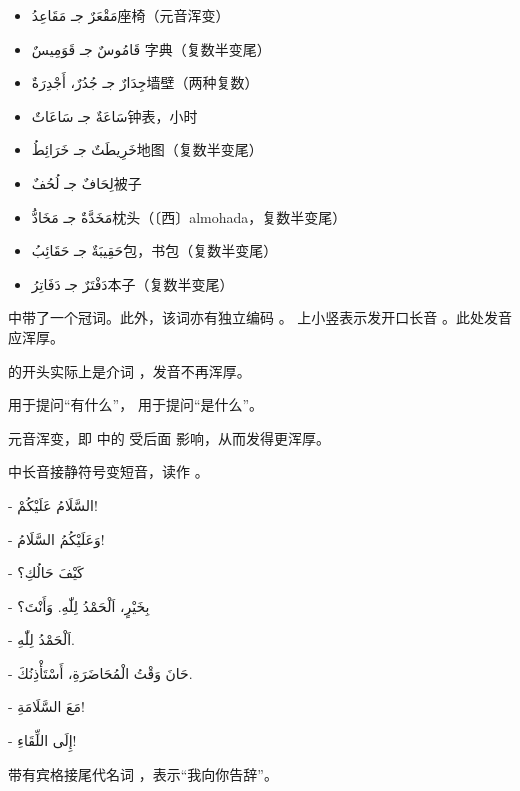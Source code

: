\begin{itemize}
    \item \ac{مَقْعَرٌ جـ مَقَاعِدُ}{座椅（元音浑变）}
    \item \ac{قَامُوسٌ جـ قَوَمِيسٌ }{字典（复数半变尾）}
    \item \ac{جِدَارٌ جـ جُدُرٌ، أَجْدِرَةٌ}{墙壁（两种复数）}
    \item \ac{سَاعَةٌ جـ سَاعَاتٌ}{钟表，小时}
    \item \ac{خَرِيطَتٌ جـ خَرَائِطُ}{地图（复数半变尾）}
    \item \ac{لِحَافٌ جـ لُحُفٌ}{被子}
    \item \ac{مَخَدَّةٌ جـ مَخَادُّ}{枕头（〔西〕almohada，复数半变尾）}
    \item \ac{حَقِيبَةٌ جـ حَقَائِبُ}{包，书包（复数半变尾）}
    \item \ac{دَفْتَرٌ جـ دَفَاتِرُ}{本子（复数半变尾）} 
\end{itemize}

\begin{note}
     中带了一个冠词。此外，该词亦有独立编码  。  上小竖表示发开口长音  。此处发音应浑厚。 
    
     的开头实际上是介词  ，发音不再浑厚。

     用于提问``有什么''， 用于提问``是什么''。 

    元音浑变，即  中的  受后面  影响，从而发得更浑厚。

     中长音接静符号变短音，读作  。
\end{note}

\begin{Arabic}
    - السَّلَامُ عَلَيْكُمْ!

    - وَعَلَيْكُمُ السَّلَامُ!

    - كَيْفَ حَالُكِ؟

    - بِخَيْرٍ، اَلْحَمْدُ لِلّٰهِ. وَأَنْتَ؟

    - اَلْحَمْدُ لِلّٰهِ.

    - حَانَ وَقْتُ الْمُحَاضَرَةِ، أَسْتَأْذِنُكَ.

    - مَعَ السَّلَامَةِ!

    - إِلَى اللِّقَاءِ!
\end{Arabic}

\begin{note}
     带有宾格接尾代名词  ，表示``我向你告辞''。
\end{note}

